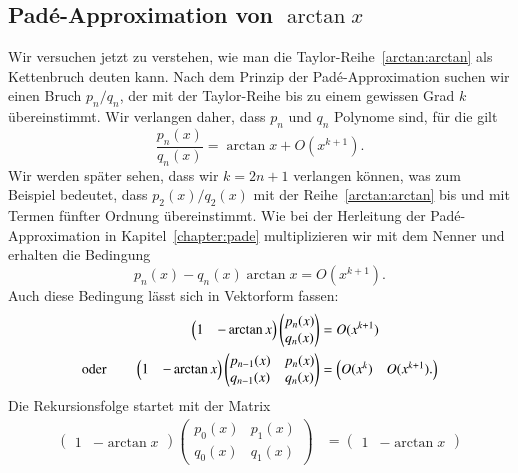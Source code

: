 \begin{refsection}
\section{Padé-Approximation von $\arctan x$
\label{arctan:section:kettenbruch}}
Wir versuchen jetzt zu verstehen, wie man die Taylor-Reihe~\ref{arctan:arctan}
als Kettenbruch deuten kann.
Nach dem Prinzip der Padé-Approximation suchen wir einen Bruch $p_n/q_n$,
der mit der Taylor-Reihe bis zu einem gewissen Grad $k$ übereinstimmt.
Wir verlangen daher, dass $p_n$ und $q_n$ Polynome sind, für die gilt
\[
\frac{p_n(x)}{q_n(x)} = \arctan x + O(x^{k+1}).
\]
Wir werden später sehen, dass wir $k=2n+1$ verlangen können, was zum
Beispiel bedeutet, dass $p_2(x)/q_2(x)$ mit der Reihe~\ref{arctan:arctan}
bis und mit Termen fünfter Ordnung übereinstimmt.
Wie bei der Herleitung der Padé-Approximation in Kapitel~\ref{chapter:pade}
multiplizieren wir mit dem Nenner und erhalten die Bedingung
\begin{equation}
p_n(x) - q_n(x)\arctan x = O(x^{k+1}).
\label{arctan:bedingung}
\end{equation}
Auch diese Bedingung lässt sich in Vektorform fassen:
\begin{align}
\begin{pmatrix}
1&-\arctan x
\end{pmatrix}
\begin{pmatrix} 
p_n(x)\\q_n(x)
\end{pmatrix}
&=
O(x^{k+1})
\notag
\\
\text{oder}\qquad
\begin{pmatrix}
1&-\arctan x
\end{pmatrix}
\begin{pmatrix}
p_{n-1}(x)&p_n(x)\\
q_{n-1}(x)&q_n(x)
\end{pmatrix}
&=
\begin{pmatrix}
O(x^{k})&O(x^{k+1}).
\end{pmatrix}
\label{arctan:bedingungmatrix}
\end{align}
Die Rekursionsfolge startet mit der Matrix
\begin{align*}
\begin{pmatrix}
1&-\arctan x
\end{pmatrix}
\begin{pmatrix}
p_0(x)&p_1(x)\\
q_0(x)&q_1(x)
\end{pmatrix}
&=
\begin{pmatrix}
1&-\arctan x

\end{pmatrix}
\end{align*}
\end{refsection}
